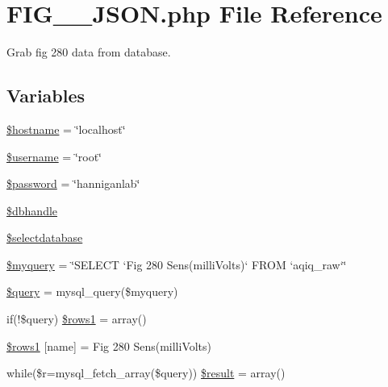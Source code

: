 \hypertarget{_f_i_g__280___j_s_o_n_8php}{}\section{F\+I\+G\+\_\+\_\+\+J\+S\+O\+N.\+php File Reference}
\label{_f_i_g__280___j_s_o_n_8php}


Grab fig 280 data from database.  


\subsection*{Variables}
\begin{DoxyCompactItemize}
\item 
\hyperlink{_f_i_g__280___j_s_o_n_8php_a8bf9ffb42ed554b203b55377d1fc9aa4}{\$hostname} = \char`\"{}localhost\char`\"{}
\item 
\hyperlink{_f_i_g__280___j_s_o_n_8php_a0eb82aa5f81cf845de4b36cd653c42cf}{\$username} = \char`\"{}root\char`\"{}
\item 
\hyperlink{_f_i_g__280___j_s_o_n_8php_a607686ef9f99ea7c42f4f3dd3dbb2b0d}{\$password} = \char`\"{}hanniganlab\char`\"{}
\item 
\hyperlink{_f_i_g__280___j_s_o_n_8php_a013f690a9cf598d1498e72aa8aa8a8d2}{\$dbhandle}
\item 
\hyperlink{_f_i_g__280___j_s_o_n_8php_a3a00cb9dd022e8ab0cdfe17aad984a14}{\$selectdatabase}
\item 
\hyperlink{_f_i_g__280___j_s_o_n_8php_a8ff37acfddb2efb7962bb94d1c6d0d1c}{\$myquery} = \char`\"{}S\+E\+L\+E\+CT `Fig 280 Sens(milli\+Volts)` F\+R\+OM `aqiq\+\_\+raw`\char`\"{}
\item 
\hyperlink{_f_i_g__280___j_s_o_n_8php_af59a5f7cd609e592c41dc3643efd3c98}{\$query} = mysql\+\_\+query(\$myquery)
\item 
if(!\$query) \hyperlink{_f_i_g__280___j_s_o_n_8php_a15da33e0f4006a60bff01708cb5d1428}{\$rows1} = array()
\item 
\hyperlink{_f_i_g__280___j_s_o_n_8php_aece741d5099bb229e07df7a57776cfaa}{\$rows1} \mbox{[}\textquotesingle{}name\textquotesingle{}\mbox{]} = \textquotesingle{}Fig 280 Sens(milli\+Volts)\textquotesingle{}
\item 
while(\$r=mysql\+\_\+fetch\+\_\+array(\$query)) \hyperlink{_f_i_g__280___j_s_o_n_8php_a9148136d1e11f768be4f805d7e567da2}{\$result} = array()
\end{DoxyCompactItemize}


